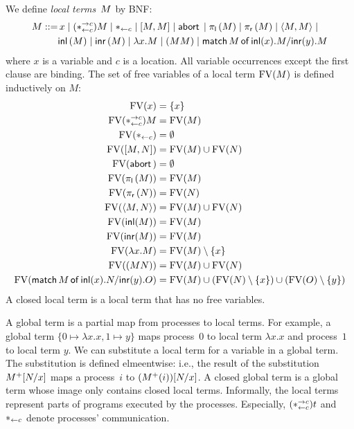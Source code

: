 We define \textit{local terms}~$M$ by BNF:
\begin{align*}
M ::=&\,
 x\mid (\ast^{\rightarrow {c}}_{\leftarrow{c}}) M \mid \ast_{\leftarrow{c}}
 \mid
 [{M,M}] \mid \mathsf{abort\,} \mid
  \pi_{\mathsf l}\left({M}\right) \mid \pi_{\mathsf r}\left({M}\right) \mid
 \langle{M,M}\rangle\mid \\&
  \mathsf{inl}\left({M}\right) \mid  \mathsf{inr}\left({M}\right) \mid
 \lambda x.M\mid (M M)
\mid \mathsf{match}\,{M}\,\mathsf{of}\, \mathsf{inl}({x}). {M}/ \mathsf{inr}({y}). {M}
\end{align*}
where $x$ is a variable and $c$ is a location.
All variable occurrences except the first clause are binding.
The set of free variables of a local term $\mathrm{FV}(M)$ is defined inductively
on $M$:
\begin{align*}
 \mathrm{FV}(x)&= \{x\}\\
 \mathrm{FV}(\ast^{\rightarrow {c}}_{\leftarrow{c}}) M&= \mathrm{FV}(M)\\
 \mathrm{FV}(\ast_{\leftarrow{c}}) &= \emptyset\\
 \mathrm{FV}([{M,N}])&= \mathrm{FV}(M)\cup \mathrm{FV}(N)\\
 \mathrm{FV}(\mathsf{abort\,})&= \emptyset\\
 \mathrm{FV}(\pi_{\mathsf l}\left({M}\right))&= \mathrm{FV}(M)\\
 \mathrm{FV}(\pi_{\mathsf r}\left({N}\right))&= \mathrm{FV}(N)\\
 \mathrm{FV}(\langle{M,N}\rangle)&= \mathrm{FV}(M)\cup \mathrm{FV}(N)\\
 \mathrm{FV}(\mathsf{inl}({M}))&= \mathrm{FV}(M)\\
 \mathrm{FV}(\mathsf{inr}({M}))&= \mathrm{FV}(M)\\
 \mathrm{FV}(\lambda x.M)&= \mathrm{FV}(M) \setminus \{x\}\\
 \mathrm{FV}((M N))&= \mathrm{FV}(M)\cup \mathrm{FV}(N)\\
 \mathrm{FV}(\mathsf{match}\,{M}\,\mathsf{of}\, \mathsf{inl}({x}). {N}/ \mathsf{inr}({y}). {O})&= \mathrm{FV}(M)\cup (\mathrm{FV}(N)\setminus \{x\}) \cup (\mathrm{FV}(O)\setminus\{y\})
\end{align*}
A closed local term is a local term that has no free variables.

A global term is a partial map from processes to local
terms.  For example, a global term $\{0\mapsto \lambda x.x, 1\mapsto
y\}$ maps process~$0$ to local term $\lambda x.x$ and process~$1$ to
local term $y$.
We can substitute a local term for a variable in a global term.
The substitution is defined elmeentwise: i.e.,
the result of the substitution ${M}^+[N/x]$ maps a process~$i$ to $({M}^+(i))[N/x]$.
A closed global term is a global term whose image only contains closed local terms.
Informally, the local terms represent parts of
programs executed by the processes.
Especially, $(\ast^{\rightarrow {c}}_{\leftarrow{c}})t$ and $\ast_{\leftarrow{c}}$ denote processes' communication.

